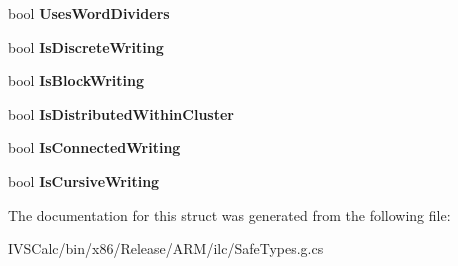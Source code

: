 \begin{DoxyCompactItemize}
bool {\bfseries Uses\+Word\+Dividers}
\item 
\mbox{\label{struct_microsoft_1_1_graphics_1_1_canvas_1_1_text_1_1_canvas_script_properties_a1b66174be7081c295ee83823a040ba2a}} 
bool {\bfseries Is\+Discrete\+Writing}
\item 
\mbox{\label{struct_microsoft_1_1_graphics_1_1_canvas_1_1_text_1_1_canvas_script_properties_acf642734ad8d59b894849070fdcc8fea}} 
bool {\bfseries Is\+Block\+Writing}
\item 
\mbox{\label{struct_microsoft_1_1_graphics_1_1_canvas_1_1_text_1_1_canvas_script_properties_ad7e009ea3ad54c08f52844447c149a15}} 
bool {\bfseries Is\+Distributed\+Within\+Cluster}
\item 
\mbox{\label{struct_microsoft_1_1_graphics_1_1_canvas_1_1_text_1_1_canvas_script_properties_a75beca914d4cc2d08a9d08f4e5601bdd}} 
bool {\bfseries Is\+Connected\+Writing}
\item 
\mbox{\label{struct_microsoft_1_1_graphics_1_1_canvas_1_1_text_1_1_canvas_script_properties_a81080f004ed845a71472beb06189929a}} 
bool {\bfseries Is\+Cursive\+Writing}
\end{DoxyCompactItemize}


The documentation for this struct was generated from the following file\+:\begin{DoxyCompactItemize}
\item 
I\+V\+S\+Calc/bin/x86/\+Release/\+A\+R\+M/ilc/Safe\+Types.\+g.\+cs\end{DoxyCompactItemize}
